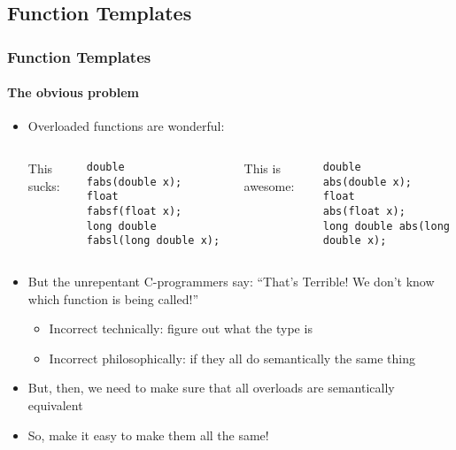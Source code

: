 \subsection{Function Templates}

\begin{frame}[fragile,t]
\frametitle{Function Templates}
\framesubtitle{The obvious problem}

\begin{itemize}[<+->]

\item Overloaded functions are wonderful:
\begin{columns}[t]
This sucks:
{\scriptsize
\begin{verbatim}
double      fabs(double x);
float       fabsf(float x);
long double fabsl(long double x);
\end{verbatim}
}
This is awesome:
{\scriptsize
\begin{verbatim}
double      abs(double x);
float       abs(float x);
long double abs(long double x);
\end{verbatim}
}
\end{columns}
\vskip 12pt
\item But the unrepentant C-programmers say:  ``That's Terrible!  We
  don't know which function is being called!''
\begin{itemize}
  \item Incorrect technically: figure out what the type is
  \item Incorrect philosophically:  if they all do semantically the same thing
\end{itemize}
\item But, then, we need to make sure that all overloads are
  semantically equivalent
\vskip 6pt
\item So, make it easy to make them all the same!
\end{itemize}
\end{frame}

